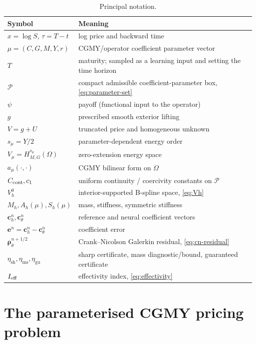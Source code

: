 \documentclass[11pt]{amsart}
\theoremstyle{remark}
\newcommand{\Pset}{\mathcal{P}}
\newcommand{\Vh}{V_h^0}
\newcommand{\Vmu}{V_{\mu}}
\newcommand{\Mh}{M_h}
\newcommand{\Ah}{A_h}
\newcommand{\Sh}{S_h}
\newcommand{\etaSharp}{\eta_{\mathrm{sh}}}
\newcommand{\etaMass}{\eta_{\mathrm{ms}}}
\newcommand{\etaGuar}{\eta_{\mathrm{gu}}}
\newcommand{\ee}{\mathbf e}
\newcommand{\cc}{\mathbf c}
\newcommand{\rr}{\bm\rho}
\newcommand{\Hs}{H^{s_\mu}_{M,G}}
\begin{document}
\begin{table}[ht]
\centering
\caption{Principal notation.}
\label{tab:notation}
\small
\begin{tabular}{ll}
\toprule
Symbol & Meaning\\
\midrule
$x=\log S$, $\tau=T-t$ & log price and backward time\\
$\mu=(C,G,M,Y,r)$ & CGMY/operator coefficient parameter vector\\
$T$ & maturity; sampled as a learning input and setting the time horizon\\
$\Pset$ & compact admissible coefficient-parameter box, \eqref{eq:parameter-set}\\
$\psi$ & payoff (functional input to the operator)\\
$g$ & prescribed smooth exterior lifting\\
$V=g+U$ & truncated price and homogeneous unknown\\
$s_\mu=Y/2$ & parameter-dependent energy order\\
$\Vmu=\Hs(\Omega)$ & zero-extension energy space\\
$a_\mu(\cdot,\cdot)$ & CGMY bilinear form on $\Omega$\\
$C_{\rm cont},c_1$ & uniform continuity / coercivity constants on $\Pset$\\
$\Vh$ & interior-supported B-spline space, \eqref{eq:Vh}\\
$\Mh,\Ah(\mu),\Sh(\mu)$ & mass, stiffness, symmetric stiffness\\
$\cc_h^n,\cc_\theta^n$ & reference and neural coefficient vectors\\
$\ee^n=\cc_h^n-\cc_\theta^n$ & coefficient error\\
$\rr_\theta^{n+1/2}$ & Crank--Nicolson Galerkin residual, \eqref{eq:cn-residual}\\
$\etaSharp,\etaMass,\etaGuar$ & sharp certificate, mass diagnostic/bound, guaranteed certificate\\
$I_{\rm eff}$ & effectivity index, \eqref{eq:effectivity}\\
\bottomrule
\end{tabular}
\end{table}

\section{The parameterised CGMY pricing problem}
\label{sec:model}
\end{document}
